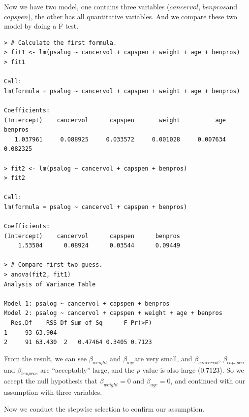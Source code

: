 \documentclass[12pt,letterpaper,titlepage,en-US]{article}
\begin{document}
Now we have two model, one contains three variables ($cancervol$, $benpros$and $capspen$), the other has all quantitative variables. And we compare these two model by doing a F test.
\begin{lstlisting}
> # Calculate the first formula.
> fit1 <- lm(psalog ~ cancervol + capspen + weight + age + benpros)
> fit1

Call:
lm(formula = psalog ~ cancervol + capspen + weight + age + benpros)

Coefficients:
(Intercept)    cancervol      capspen       weight          age      benpros
   1.037961     0.088925     0.033572     0.001028     0.007634     0.082325

> fit2 <- lm(psalog ~ cancervol + capspen + benpros)
> fit2

Call:
lm(formula = psalog ~ cancervol + capspen + benpros)

Coefficients:
(Intercept)    cancervol      capspen      benpros
    1.53504      0.08924      0.03544      0.09449

> # Compare first two guess.
> anova(fit2, fit1)
Analysis of Variance Table

Model 1: psalog ~ cancervol + capspen + benpros
Model 2: psalog ~ cancervol + capspen + weight + age + benpros
  Res.Df    RSS Df Sum of Sq      F Pr(>F)
1     93 63.904
2     91 63.430  2   0.47464 0.3405 0.7123
\end{lstlisting}

From the result, we can see $\beta_{weight}$ and $\beta_{age}$are very small, and $\beta_{cancervol}$, $\beta_{capspen}$ and $\beta_{benpros}$ are ``acceptably'' large, and the $p$ value is also large ($0.7123$). So we accept the null hypothesis that $\beta_{weight} = 0$ and $\beta_{age} = 0$, and continued with our assumption with three variables.

Now we conduct the stepwise selection to confirm our assumption.
\end{document}
